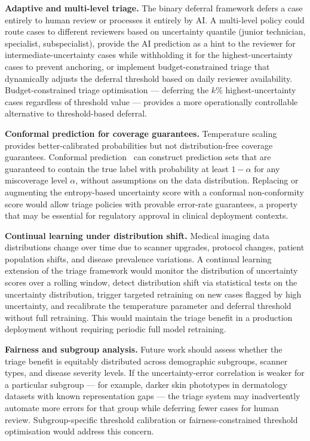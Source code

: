 \textbf{Adaptive and multi-level triage.} The binary deferral framework defers a case entirely to human review or processes it entirely by AI. A multi-level policy could route cases to different reviewers based on uncertainty quantile (junior technician, specialist, subspecialist), provide the AI prediction as a hint to the reviewer for intermediate-uncertainty cases while withholding it for the highest-uncertainty cases to prevent anchoring, or implement budget-constrained triage that dynamically adjusts the deferral threshold based on daily reviewer availability. Budget-constrained triage optimisation --- deferring the $k\%$ highest-uncertainty cases regardless of threshold value --- provides a more operationally controllable alternative to threshold-based deferral.

\textbf{Conformal prediction for coverage guarantees.} Temperature scaling provides better-calibrated probabilities but not distribution-free coverage guarantees. Conformal prediction~\cite{angelopoulos2021gentle} can construct prediction sets that are guaranteed to contain the true label with probability at least $1-\alpha$ for any miscoverage level $\alpha$, without assumptions on the data distribution. Replacing or augmenting the entropy-based uncertainty score with a conformal non-conformity score would allow triage policies with provable error-rate guarantees, a property that may be essential for regulatory approval in clinical deployment contexts.

\textbf{Continual learning under distribution shift.} Medical imaging data distributions change over time due to scanner upgrades, protocol changes, patient population shifts, and disease prevalence variations. A continual learning extension of the triage framework would monitor the distribution of uncertainty scores over a rolling window, detect distribution shift via statistical tests on the uncertainty distribution, trigger targeted retraining on new cases flagged by high uncertainty, and recalibrate the temperature parameter and deferral threshold without full retraining. This would maintain the triage benefit in a production deployment without requiring periodic full model retraining.

\textbf{Fairness and subgroup analysis.} Future work should assess whether the triage benefit is equitably distributed across demographic subgroups, scanner types, and disease severity levels. If the uncertainty-error correlation is weaker for a particular subgroup --- for example, darker skin phototypes in dermatology datasets with known representation gaps --- the triage system may inadvertently automate more errors for that group while deferring fewer cases for human review. Subgroup-specific threshold calibration or fairness-constrained threshold optimisation would address this concern.

